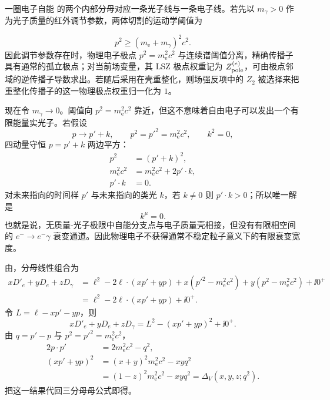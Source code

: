 \begin{derivation}[在壳电子为何没有真空衰变宽度]
一圈电子自能  的两个内部分母对应一条光子线与一条电子线。若先以 $m_\gamma>0$ 作为光子质量的红外调节参数，两体切割的运动学阈值为

\begin{equation*}
 p^2\ge (m_{\mathrm e}+m_\gamma)^2c^2.
 \end{equation*}
因此调节参数存在时，物理电子极点 $p^2=m_{\mathrm e}^2c^2$ 与连续谱阈值分离，精确传播子具有通常的孤立极点；对当前场变量，其 LSZ 极点权重记为 $Z_{\rm pole}^{(e)}$，可由极点邻域的逆传播子导数求出。若随后采用在壳重整化，则场强反项中的 $Z_2$ 被选择来把重整化传播子的这一物理极点权重归一化为 $1$。

现在令 $m_\gamma\to0$。阈值向 $p^2=m_{\mathrm e}^2c^2$ 靠近，但这不意味着自由电子可以发出一个有限能量实光子。若假设
\begin{equation*}
 p\to p'+k,
 \qquad
 p^2=p'^2=m_{\mathrm e}^2c^2,
 \qquad
 k^2=0,
\end{equation*}
四动量守恒 $p=p'+k$ 两边平方：
\begin{align*}
 p^2
 &=(p'+k)^2,\\
 m_{\mathrm e}^2c^2
 &=m_{\mathrm e}^2c^2+2p'\!\cdot k,\\
 p'\!\cdot k&=0.
\end{align*}
对未来指向的时间样 $p'$ 与未来指向的类光 $k$，若 $k\neq0$ 则 $p'\!\cdot k>0$；所以唯一解是
\begin{equation*}
 {k^\mu=0.}
 \end{equation*}
也就是说，无质量-光子极限中自能分支点与电子质量壳相接，但没有有限相空间的 $e^-\to e^-\gamma$ 衰变通道。因此物理电子不获得通常不稳定粒子意义下的有限衰变宽度。
\end{derivation}

\begin{derivation}[一圈顶角的参数化与动量平移]
由，分母线性组合为
\begin{align*}
xD'_e+yD_e+zD_\gamma
&=\ell^2-2\ell\cdot(xp'+yp)
+x(p'^2-m_{\mathrm e}^2c^2)+y(p^2-m_{\mathrm e}^2c^2)+\ii0^+\\
&=\ell^2-2\ell\cdot(xp'+yp)+\ii0^+.
\end{align*}
令 $L=\ell-xp'-yp$，则
\begin{equation*}
xD'_e+yD_e+zD_\gamma
=L^2-(xp'+yp)^2+\ii0^+.
\end{equation*}
由 $q=p'-p$ 与 $p^2=p'^2=m_{\mathrm e}^2c^2$，
\begin{align*}
2p\!\cdot p'&=2m_{\mathrm e}^2c^2-q^2,\\
(xp'+yp)^2
&=(x+y)^2m_{\mathrm e}^2c^2-xyq^2\\
&=(1-z)^2m_{\mathrm e}^2c^2-xyq^2
=\Delta_V(x,y,z;q^2).
\end{align*}
把这一结果代回三分母母公式即得。
\end{derivation}

